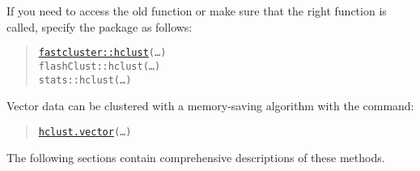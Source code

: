 \documentclass[fontsize=10pt,paper=letter,BCOR=-6mm,DIV=8]{scrartcl}
\begin{document}
If you need to access the old function or make sure that the right function is
called, specify the package as follows:
\begin{quote}
    \texttt{\hyperref[hclust]{fastcluster::hclust}(…)}\\
    \texttt{flashClust::hclust(…)}\\
    \texttt{stats::hclust(…)}
\end{quote}

Vector data can be clustered with a memory-saving algorithm with the command:
\begin{quote}
    \texttt{\hyperref[hclust.vector]{hclust.vector}(…)}
 \end{quote}

The following sections contain comprehensive descriptions of these methods.
\end{document}
